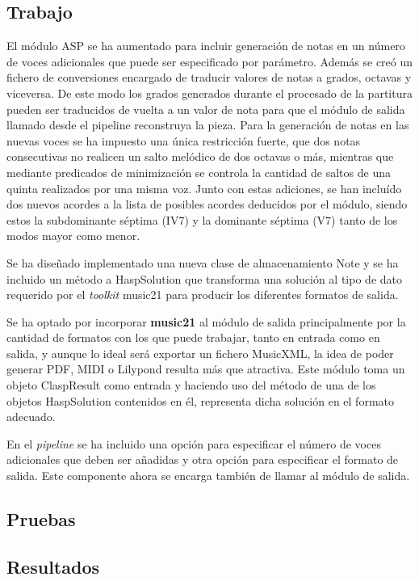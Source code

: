\subsection{Trabajo}
El módulo ASP se ha aumentado para incluir generación de notas en un número de voces adicionales que puede ser especificado por parámetro. Además se creó un fichero de conversiones encargado de traducir valores de notas a grados, octavas y viceversa. De este modo los grados generados durante el procesado de la partitura pueden ser traducidos de vuelta a un valor de nota para que el módulo de salida llamado desde el pipeline reconstruya la pieza. Para la generación de notas en las nuevas voces se ha impuesto una única restricción fuerte, que dos notas consecutivas no realicen un salto melódico de dos octavas o más, mientras que mediante predicados de minimización se controla la cantidad de saltos de una quinta realizados por una misma voz. Junto con estas adiciones, se han incluído dos nuevos acordes a la lista de posibles acordes deducidos por el módulo, siendo estos la subdominante séptima (IV7) y la dominante séptima (V7) tanto de los modos mayor como menor.

Se ha diseñado implementado una nueva clase de almacenamiento Note y se ha incluido un método a HaspSolution que transforma una solución al tipo de dato requerido por el \textit{toolkit} music21 para producir los diferentes formatos de salida.

Se ha optado por incorporar \textbf{music21} al módulo de salida principalmente por la cantidad de formatos con los que puede trabajar, tanto en entrada como en salida, y aunque lo ideal será exportar un fichero MusicXML, la idea de poder generar PDF, MIDI o Lilypond resulta más que atractiva. Este módulo toma un objeto ClaspResult como entrada y haciendo uso del método de una de los objetos HaspSolution contenidos en él, representa dicha solución en el formato adecuado.

En el \textit{pipeline} se ha incluido una opción para especificar el número de voces adicionales que deben ser añadidas y otra opción para especificar el formato de salida. Este componente ahora se encarga también de llamar al módulo de salida.

\subsection{Pruebas}

\subsection{Resultados}

